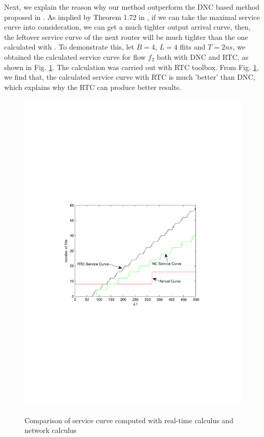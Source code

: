 \documentclass[10pt,journal]{IEEEtran}
\begin{document}
Next, we explain the reason why our method outperform the DNC based method proposed in \cite{Qian489900}. As implied by Theorem 1.72 in \cite{Boudec2001Network}, if we can take the maximal service curve into consideration, we can get a much tighter output arrival curve, then, the leftover service curve of the next router will be much tighter than the one calculated with \cite{qian2009analysis}. To demonstrate this, let $B=4$, $L=4$ flits and $T=2ns$, we obtained the calculated service curve for flow $f_2$ both with DNC and RTC, as shown in Fig. \ref{loose}. The calculation was carried out with RTC toolbox. From Fig. \ref{loose}, we find that, the calculated service curve with RTC is much 'better' than DNC, which explains why the RTC can produce better results.
\begin{figure}
  \centering
  \includegraphics[scale=0.6]{figures/loose.pdf}\\
  \caption{Comparison of service curve computed with real-time calculus and network calculus}\label{loose}
\end{figure}
\end{document}
